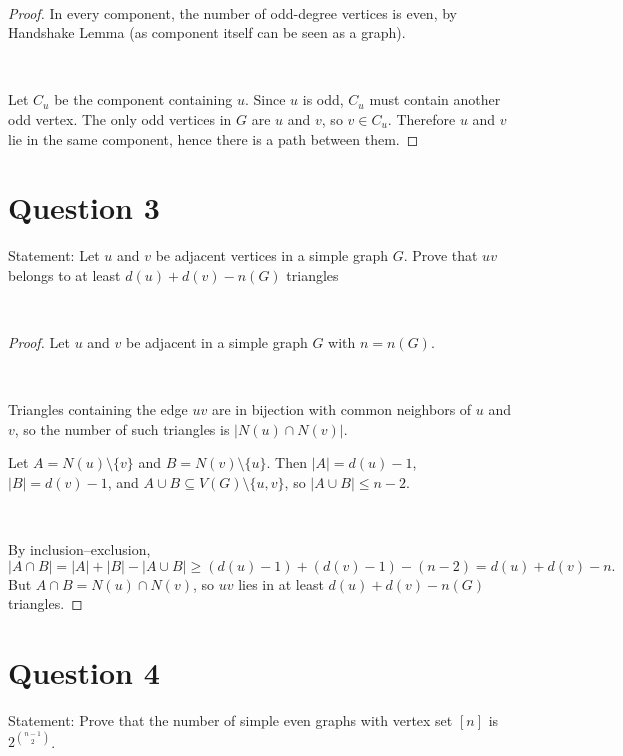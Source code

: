 \documentclass[11pt]{article}
\begin{document}
~

\begin{proof}
    In every component, the number of odd-degree vertices is even, by Handshake Lemma (as component itself can be seen as a graph).

    ~
    
\noindent Let $C_u$ be the component containing $u$. Since $u$ is odd, $C_u$ must contain another odd vertex.
The only odd vertices in $G$ are $u$ and $v$, so $v\in C_u$. Therefore $u$ and $v$ lie in the same component,
hence there is a path between them.
\end{proof}

\newpage

\section*{Question 3}

Statement:  Let $u$ and $v$ be adjacent vertices in a simple graph $G$. Prove that $uv$ belongs to at least $d(u)+d(v)-n(G)$ triangles


~

\begin{proof}
    Let $u$ and $v$ be adjacent in a simple graph $G$ with $n=n(G)$.


    ~
    
    Triangles containing the edge $uv$ are in bijection with common neighbors of $u$ and $v$,
so the number of such triangles is $|N(u)\cap N(v)|$.

Let $A=N(u)\setminus\{v\}$ and $B=N(v)\setminus\{u\}$. Then $|A|=d(u)-1$, $|B|=d(v)-1$,
and $A\cup B\subseteq V(G)\setminus\{u,v\}$, so $|A\cup B|\le n-2$.

~

By inclusion--exclusion,
\[
|A\cap B|=|A|+|B|-|A\cup B|\ge (d(u)-1)+(d(v)-1)-(n-2)=d(u)+d(v)-n.
\]
But $A\cap B=N(u)\cap N(v)$, so $uv$ lies in at least $d(u)+d(v)-n(G)$ triangles.
\end{proof}

\newpage

\section*{Question 4}

Statement: Prove that the number of simple even graphs with vertex set $[n]$ is $2^{\binom{n-1}{2}}$.
\end{document}
